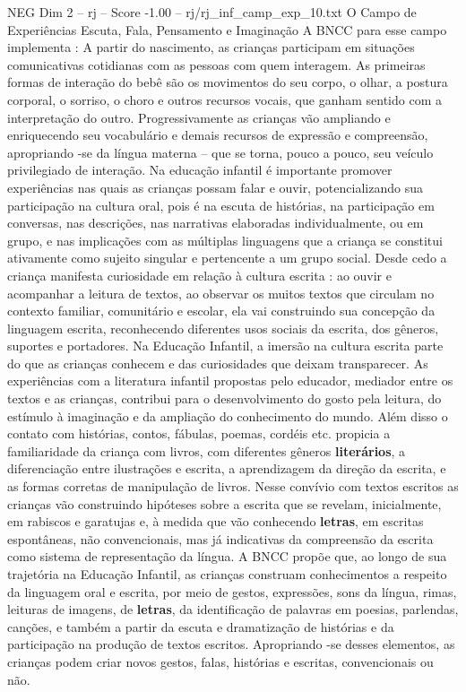 \begin{textsample}{NEG Dim 2 – rj – Score -1.00 – rj/rj\_inf\_camp\_exp\_10.txt}  \label{ex:f2_neg_056}
O Campo de Experiências Escuta, Fala, Pensamento e Imaginação A BNCC para esse campo implementa : A partir do nascimento, as crianças participam em situações comunicativas cotidianas com as pessoas com quem interagem.
As primeiras formas de interação do bebê são os movimentos do seu corpo, o olhar, a postura corporal, o sorriso, o choro e outros recursos vocais, que ganham sentido com a interpretação do outro.
Progressivamente as crianças vão ampliando e enriquecendo seu vocabulário e demais recursos de expressão e compreensão, apropriando -se da língua materna – que se torna, pouco a pouco, seu veículo privilegiado de interação.
Na educação infantil é importante promover experiências nas quais as crianças possam falar e ouvir, potencializando sua participação na cultura oral, pois é na escuta de histórias, na participação em conversas, nas descrições, nas narrativas elaboradas individualmente, ou em grupo, e nas implicações com as múltiplas linguagens que a criança se constitui ativamente como sujeito singular e pertencente a um grupo social.
Desde cedo a criança manifesta curiosidade em relação à cultura escrita : ao ouvir e acompanhar a leitura de textos, ao observar os muitos textos que circulam no contexto familiar, comunitário e escolar, ela vai construindo sua concepção da linguagem escrita, reconhecendo diferentes usos sociais da escrita, dos gêneros, suportes e portadores.
Na Educação Infantil, a imersão na cultura escrita parte do que as crianças conhecem e das curiosidades que deixam transparecer.
As experiências com a literatura infantil propostas pelo educador, mediador entre os textos e as crianças, contribui para o desenvolvimento do gosto pela leitura, do estímulo à imaginação e da ampliação do conhecimento do mundo.
Além disso o contato com histórias, contos, fábulas, poemas, cordéis etc. propicia a familiaridade da criança com livros, com diferentes gêneros \textbf{literários}, a diferenciação entre ilustrações e escrita, a aprendizagem da direção da escrita, e as formas corretas de manipulação de livros.
Nesse convívio com textos escritos as crianças vão construindo hipóteses sobre a escrita que se revelam, inicialmente, em rabiscos e garatujas e, à medida que vão conhecendo \textbf{letras}, em escritas espontâneas, não convencionais, mas já indicativas da compreensão da escrita como sistema de representação da língua.
A BNCC propõe que, ao longo de sua trajetória na Educação Infantil, as crianças construam conhecimentos a respeito da linguagem oral e escrita, por meio de gestos, expressões, sons da língua, rimas, leituras de imagens, de \textbf{letras}, da identificação de palavras em poesias, parlendas, canções, e também a partir da escuta e dramatização de histórias e da participação na produção de textos escritos.
Apropriando -se desses elementos, as crianças podem criar novos gestos, falas, histórias e escritas, convencionais ou não.

\end{textsample}
